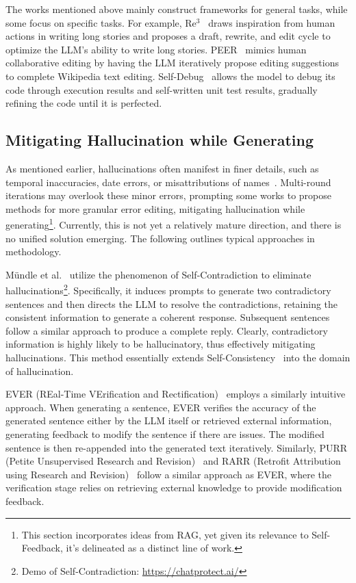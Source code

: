 \documentclass[lettersize,journal]{IEEEtran}
\begin{document}
The works mentioned above mainly construct frameworks for general tasks, while some focus on specific tasks. For example, Re$^3$~\cite{Re3_23_EMNLP_Berkeley} draws inspiration from human actions in writing long stories and proposes a draft, rewrite, and edit cycle to optimize the LLM's ability to write long stories. PEER~\cite{PEER_23_ICLR_Meta} mimics human collaborative editing by having the LLM iteratively propose editing suggestions to complete Wikipedia text editing. Self-Debug~\cite{SelfDebug_24_ICLR_Google} allows the model to debug its code through execution results and self-written unit test results, gradually refining the code until it is perfected.


\subsection{Mitigating Hallucination while Generating} \label{sec:mitigating_hallucination_while}


\noindent As mentioned earlier, hallucinations often manifest in finer details, such as temporal inaccuracies, date errors, or misattributions of names~\cite{liang2023uhgeval}. Multi-round iterations may overlook these minor errors, prompting some works to propose methods for more granular error editing, mitigating hallucination while generating\footnote{This section incorporates ideas from RAG, yet given its relevance to Self-Feedback, it's delineated as a distinct line of work.}. Currently, this is not yet a relatively mature direction, and there is no unified solution emerging. The following outlines typical approaches in methodology.

M\"undle et al.~\cite{HalluSelfContradictory_24_ICLR_ETH} utilize the phenomenon of Self-Contradiction to eliminate hallucinations\footnote{Demo of Self-Contradiction: \url{https://chatprotect.ai/}}. Specifically, it induces prompts to generate two contradictory sentences and then directs the LLM to resolve the contradictions, retaining the consistent information to generate a coherent response. Subsequent sentences follow a similar approach to produce a complete reply. Clearly, contradictory information is highly likely to be hallucinatory, thus effectively mitigating hallucinations. This method essentially extends Self-Consistency~\cite{SelfConsistency_23_ICLR_Google} into the domain of hallucination.

EVER (REal-Time VErification and Rectification)~\cite{EVER_arXiv_23_UNC} employs a similarly intuitive approach. When generating a sentence, EVER verifies the accuracy of the generated sentence either by the LLM itself or retrieved external information, generating feedback to modify the sentence if there are issues. The modified sentence is then re-appended into the generated text iteratively. Similarly, PURR (Petite Unsupervised Research and Revision)~\cite{PURR_23_arXiv_UCI} and RARR (Retrofit Attribution using Research and Revision)~\cite{RARR_23_ACL_CMU} follow a similar approach as EVER, where the verification stage relies on retrieving external knowledge to provide modification feedback.
\end{document}
